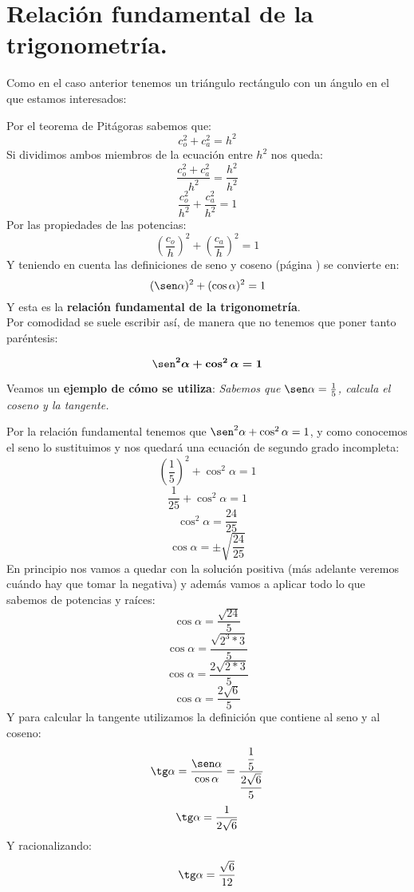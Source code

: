 \documentclass[a4paper,11pt,answers]{exam}
\newcommand\ddfrac[2]{\frac{\displaystyle #1}{\displaystyle #2}}
\begin{document}
\section{Relación fundamental de la trigonometría.}
Como en el caso anterior tenemos un triángulo rectángulo con un ángulo en el que estamos interesados:
\vspace*{5mm}
\begin{center}
\end{center}
Por el teorema de Pitágoras sabemos que:
\[c_o^2 + c_a^2 = h^2\]
Si dividimos ambos miembros de la ecuación entre $h^2$ nos queda:
\[\frac{c_o^2 + c_a^2}{h^2} = \frac{h^2}{h^2}\]
\[\frac{c_o^2}{h^2} + \frac{c_a^2}{h^2} = 1\]
Por las propiedades de las potencias:
\[\left(\frac{c_o}{h}\right)^2 + \left(\frac{c_a}{h}\right)^2 = 1\]
Y teniendo en cuenta las definiciones de seno y coseno (página \pageref{def_razones}) se convierte en:
\[(\sen \alpha)^2 + (\cos \alpha)^2 =1 \]
Y esta es la \textbf{relación fundamental de la trigonometría}.\\

Por comodidad se suele escribir así, de manera que no tenemos que poner tanto paréntesis:
\begin{Large}
  \[\boldsymbol{\sen^2 \alpha + \cos^2 \alpha = 1}\]
\end{Large}

Veamos un \textbf{ejemplo de cómo se utiliza}:
\emph{Sabemos que $\sen \alpha = \frac{1}{5}$, calcula el coseno y la tangente.}
\begin{solution}
  Por la relación fundamental tenemos que $\sen^2 \alpha + \cos^2 \alpha = 1$, y como conocemos el seno lo sustituimos y nos quedará una ecuación de segundo grado incompleta:
  \[\left(\frac{1}{5}\right)^2 + \cos^2 \alpha = 1\]
  \[\frac{1}{25} + \cos^2 \alpha = 1\]
  \[\cos^2 \alpha = \frac{24}{25}\]
  \[\cos \alpha = \pm \sqrt{\frac{24}{25}}\]
  En principio nos vamos a quedar con la solución positiva (más adelante veremos cuándo hay que tomar la negativa) y además vamos a aplicar todo lo que sabemos de potencias y raíces:
  \[\cos \alpha = \frac{\sqrt{24}}{5}\]
  \[\cos \alpha = \frac{\sqrt{2^3 * 3}}{5}\]
  \[\cos \alpha = \frac{2\sqrt{2*3}}{5}\]
  \[\cos \alpha = \frac{2\sqrt{6}}{5}\]
  Y para calcular la tangente utilizamos la definición que contiene al seno y al coseno:
  \[\tg \alpha = \frac{\sen \alpha}{\cos \alpha} = \ddfrac{\frac{1}{5}}{\frac{2\sqrt{6}}{5}}\]
  \[\tg \alpha = \frac{1}{{2\sqrt{6}}}\]
  Y racionalizando:
  \[\tg \alpha = \frac{\sqrt{6}}{12}\]
\end{solution}
\end{document}
